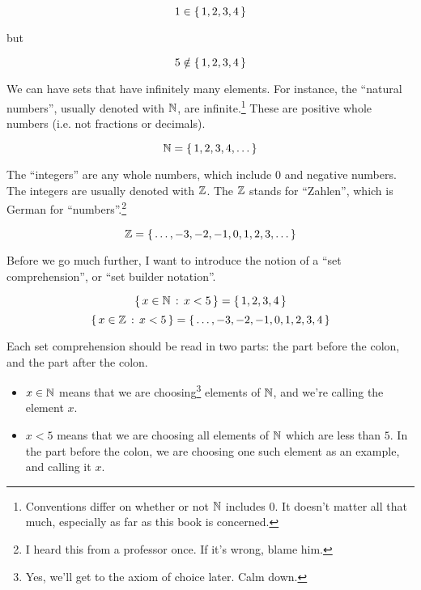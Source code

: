 \begin{displaymath}
  1 \in \left\{ \, 1,2,3,4 \, \right\}
\end{displaymath}

but 

\begin{displaymath}
  5 \notin \left\{ \, 1,2,3,4 \, \right\}
\end{displaymath}

We can have sets that have infinitely many elements. For instance, the
``natural numbers'', usually denoted with $\mathbb{N}$, are
infinite.\footnote{Conventions differ on whether or not $\mathbb{N}$ includes
  $0$. It doesn't matter all that much, especially as far as this book
  is concerned.} These are positive whole numbers (i.e. not fractions
or decimals).

\begin{displaymath}
  \mathbb{N} = \left\{ \, 1,2,3,4,\dots \, \right\}
\end{displaymath}

The ``integers'' are any whole numbers, which include $0$ and negative
numbers. The integers are usually denoted with $\mathbb{Z}$. The $\mathbb{Z}$ stands
for ``Zahlen'', which is German for ``numbers''.\footnote{I heard this
  from a professor once. If it's wrong, blame him.}

\begin{displaymath}
  \mathbb{Z} = \left\{ \, \dots, -3, -2, -1, 0, 1, 2, 3, \dots \, \right\}
\end{displaymath}

Before we go much further, I want to introduce the notion of a ``set
comprehension'', or ``set builder notation''.

\begin{displaymath}
  \left\{ \,  x \in \mathbb{N} \, : \, x < 5  \, \right\} = \left\{ \, 1,2,3,4 \, \right\}
\end{displaymath}
\begin{displaymath}
  \left\{ \,  x \in \mathbb{Z} \, : \, x < 5  \, \right\} = \left\{ \, \dots,-3,-2,-1,0,1,2,3,4 \, \right\}
\end{displaymath}

Each set comprehension should be read in two parts: the part before
the colon, and the part after the colon.

\begin{itemize}
\item $x \in \mathbb{N}$ means that we are choosing\footnote{Yes, we'll get to
    the axiom of choice later. Calm down.} elements of $\mathbb{N}$, and we're
  calling the element $x$.
\item $x < 5$ means that we are choosing all elements of $\mathbb{N}$ which
  are less than $5$. In the part before the colon, we are choosing one
  such element as an example, and calling it $x$.
\end{itemize}